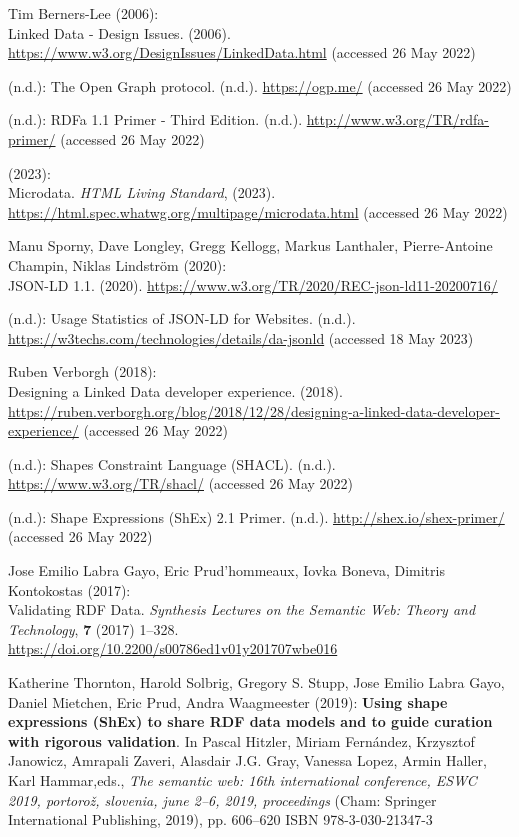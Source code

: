 \begin{thebibliography}{9}
Tim Berners-Lee (2006): \\
Linked {Data} - {Design Issues}. (2006).
\url{https://www.w3.org/DesignIssues/LinkedData.html} (accessed 26 May
2022)

(n.d.): The {Open Graph} protocol. (n.d.). \url{https://ogp.me/}
(accessed 26 May 2022)

(n.d.): {RDFa} 1.1 {Primer} - {Third Edition}. (n.d.).
\url{http://www.w3.org/TR/rdfa-primer/} (accessed 26 May 2022)

(2023): \\
{Microdata}. \emph{{HTML Living Standard}}, (2023).
\url{https://html.spec.whatwg.org/multipage/microdata.html} (accessed 26
May 2022)

Manu Sporny, Dave Longley, Gregg Kellogg, Markus Lanthaler,
Pierre-Antoine Champin, Niklas Lindström (2020): \\
{JSON-LD} 1.1.
(2020). \url{https://www.w3.org/TR/2020/REC-json-ld11-20200716/}

(n.d.): {Usage Statistics of JSON-LD for Websites}. (n.d.).
\url{https://w3techs.com/technologies/details/da-jsonld} (accessed 18
May 2023)

Ruben Verborgh (2018): \\
Designing a {Linked Data} developer experience.
(2018).
\url{https://ruben.verborgh.org/blog/2018/12/28/designing-a-linked-data-developer-experience/}
(accessed 26 May 2022)

(n.d.): Shapes {Constraint Language} ({SHACL}). (n.d.).
\url{https://www.w3.org/TR/shacl/} (accessed 26 May 2022)

(n.d.): Shape {Expressions} ({ShEx}) 2.1 {Primer}. (n.d.).
\url{http://shex.io/shex-primer/} (accessed 26 May 2022)

Jose Emilio Labra Gayo, Eric Prud'hommeaux, Iovka Boneva, Dimitris
Kontokostas (2017): \\
Validating {RDF Data}. \emph{Synthesis Lectures on
the Semantic Web: Theory and Technology}, \textbf{7} (2017) 1--328.
\url{https://doi.org/10.2200/s00786ed1v01y201707wbe016}

Katherine Thornton, Harold Solbrig, Gregory S. Stupp, Jose Emilio Labra
Gayo, Daniel Mietchen, Eric Prud, Andra Waagmeester (2019):
\textbf{Using shape expressions ({ShEx}) to share {RDF} data models and
to guide curation with rigorous validation}. In Pascal Hitzler, Miriam
Fernández, Krzysztof Janowicz, Amrapali Zaveri, Alasdair J.G. Gray,
Vanessa Lopez, Armin Haller, Karl Hammar,eds., \emph{The semantic
web: 16th international conference, {ESWC} 2019, portorož, slovenia,
june 2--6, 2019, proceedings} ({Cham}: {Springer International
Publishing}, 2019), pp. 606--620 ISBN 978-3-030-21347-3


\end{thebibliography}
